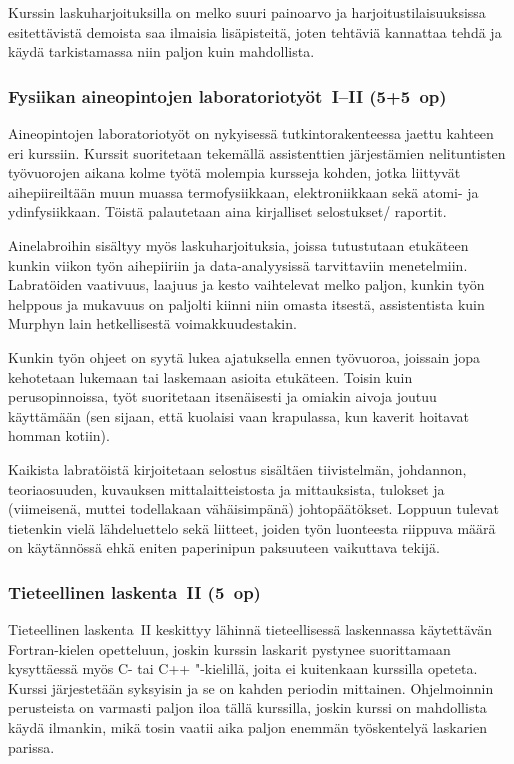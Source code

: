 \documentclass[../ala_hataile.tex]{subfiles}
\begin{document}
	Kurssin lasku\-harjoituksilla on melko
	suuri paino\-arvo ja harjoitus\-tilaisuuksissa
	esitettävistä demoista saa ilmaisia lisäpisteitä,
	joten tehtäviä kannattaa tehdä ja käydä
	tarkistamassa niin paljon kuin mahdollista.
	
	\subsubsection*{Fysiikan aineopintojen laboratoriotyöt~I--II (5+5~op)}
	Aineopintojen laboratorio\-työt on nykyisessä
	tutkinto\-rakenteessa jaettu kahteen eri
	kurssiin. Kurssit suoritetaan tekemällä
	assistenttien järjestämien neli\-tuntisten
	työ\-vuorojen aikana kolme työtä molempia kursseja kohden, jotka liittyvät
	aihe\-piireiltään muun muassa termo\-fysiikkaan, elektroniikkaan
	sekä atomi- ja ydin\-fysiikkaan. Töistä
	palautetaan aina kirjalliset selostukset/
	raportit.
	
	Aine\-labroihin sisältyy myös lasku\-harjoituksia, joissa tutustutaan etukäteen kunkin viikon työn aihe\-piiriin ja data-analyysissä tarvittaviin menetelmiin.
	Labratöiden vaativuus, laajuus ja kesto
	vaihtelevat melko paljon, kunkin työn
	helppous ja mukavuus on paljolti kiinni
	niin omasta itsestä, assistentista kuin Murphyn
	lain hetkellisestä voimakkuudestakin.
	
	Kunkin työn ohjeet on syytä lukea ajatuksella
	ennen työ\-vuoroa, joissain jopa
	kehotetaan lukemaan tai laskemaan asioita
	etukäteen. Toisin kuin perus\-opinnoissa,
	työt suoritetaan itsenäisesti ja omiakin
	aivoja joutuu käyttämään (sen sijaan, että
	kuolaisi vaan krapulassa, kun kaverit hoitavat
	homman kotiin). 
	
	Kaikista labra\-töistä kirjoitetaan
	selostus sisältäen tiivistelmän, johdannon,
	teoria\-osuuden, kuvauksen mitta\-laitteistosta
	ja mittauksista, tulokset ja (viimeisenä, muttei todellakaan vähäisimpänä) johto\-päätökset.
	Loppuun tulevat tietenkin vielä
	lähde\-luettelo sekä liitteet, joiden työn luonteesta
	riippuva määrä on käytännössä ehkä
	eniten paperi\-nipun paksuuteen vaikuttava
	tekijä.
	
	\subsubsection*{Tieteellinen laskenta~II (5~op)}
	Tieteellinen laskenta~II keskittyy lähinnä
	tieteellisessä laskennassa käytettävän
	Fortran-kielen opetteluun, joskin kurssin
	laskarit pystynee suorittamaan kysyttäessä myös C- tai C++ "-kielillä, joita ei kuitenkaan
	kurssilla opeteta. Kurssi järjestetään
	syksyisin ja se on kahden periodin mittainen.
	Ohjelmoinnin perusteista on varmasti
	paljon iloa tällä kurssilla, joskin kurssi on
	mahdollista käydä ilmankin, mikä tosin
	vaatii aika paljon enemmän työskentelyä
	laskarien parissa.
	
\end{document}
